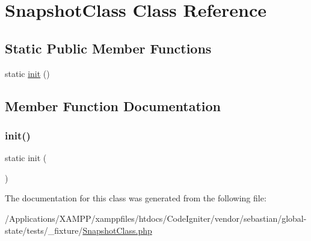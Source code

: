 \hypertarget{class_sebastian_bergmann_1_1_global_state_1_1_test_fixture_1_1_snapshot_class}{}\section{Snapshot\+Class Class Reference}
\label{class_sebastian_bergmann_1_1_global_state_1_1_test_fixture_1_1_snapshot_class}
\subsection*{Static Public Member Functions}
\begin{DoxyCompactItemize}
\item 
static \mbox{\hyperlink{class_sebastian_bergmann_1_1_global_state_1_1_test_fixture_1_1_snapshot_class_a9f0be6ae273d3669e11c29910a0be338}{init}} ()
\end{DoxyCompactItemize}


\subsection{Member Function Documentation}
\mbox{\label{class_sebastian_bergmann_1_1_global_state_1_1_test_fixture_1_1_snapshot_class_a9f0be6ae273d3669e11c29910a0be338}} 
\subsubsection{\texorpdfstring{init()}{init()}}
{\footnotesize\ttfamily static init (\begin{DoxyParamCaption}{ }\end{DoxyParamCaption})\hspace{0.3cm}{\ttfamily [static]}}



The documentation for this class was generated from the following file\+:\begin{DoxyCompactItemize}
\item 
/\+Applications/\+X\+A\+M\+P\+P/xamppfiles/htdocs/\+Code\+Igniter/vendor/sebastian/global-\/state/tests/\+\_\+fixture/\mbox{\hyperlink{_snapshot_class_8php}{Snapshot\+Class.\+php}}\end{DoxyCompactItemize}
